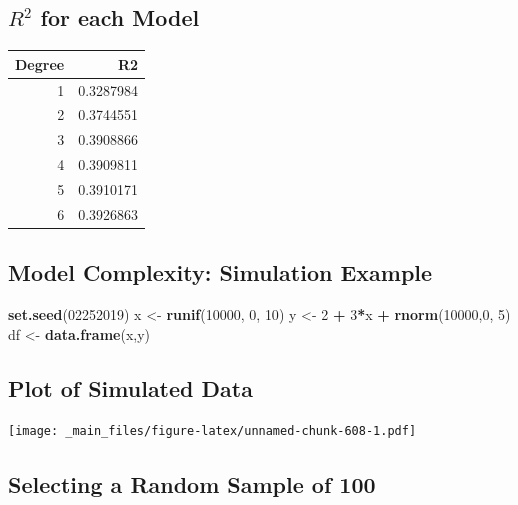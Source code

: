 \documentclass[]{book}
\newenvironment{Shaded}{\begin{snugshade}}{\end{snugshade}}
\newcommand{\KeywordTok}[1]{\textcolor[rgb]{0.13,0.29,0.53}{\textbf{#1}}}
\newcommand{\DecValTok}[1]{\textcolor[rgb]{0.00,0.00,0.81}{#1}}
\newcommand{\StringTok}[1]{\textcolor[rgb]{0.31,0.60,0.02}{#1}}
\newcommand{\OperatorTok}[1]{\textcolor[rgb]{0.81,0.36,0.00}{\textbf{#1}}}
\newcommand{\NormalTok}[1]{#1}
\begin{document}
\subsection{\texorpdfstring{\(R^2\) for each
Model}{R\^{}2 for each Model}}\label{r2-for-each-model}

\begin{tabular}{r|r}
\hline
Degree & R2\\
\hline
1 & 0.3287984\\
\hline
2 & 0.3744551\\
\hline
3 & 0.3908866\\
\hline
4 & 0.3909811\\
\hline
5 & 0.3910171\\
\hline
6 & 0.3926863\\
\hline
\end{tabular}

\subsection{Model Complexity: Simulation
Example}\label{model-complexity-simulation-example}

\begin{Shaded}
\begin{Highlighting}[]
\KeywordTok{set.seed}\NormalTok{(}\DecValTok{02252019}\NormalTok{)}
\NormalTok{x <-}\StringTok{ }\KeywordTok{runif}\NormalTok{(}\DecValTok{10000}\NormalTok{, }\DecValTok{0}\NormalTok{, }\DecValTok{10}\NormalTok{)}
\NormalTok{y <-}\StringTok{ }\DecValTok{2} \OperatorTok{+}\StringTok{ }\DecValTok{3}\OperatorTok{*}\NormalTok{x }\OperatorTok{+}\StringTok{ }\KeywordTok{rnorm}\NormalTok{(}\DecValTok{10000}\NormalTok{,}\DecValTok{0}\NormalTok{, }\DecValTok{5}\NormalTok{)}
\NormalTok{df <-}\StringTok{ }\KeywordTok{data.frame}\NormalTok{(x,y)}
\end{Highlighting}
\end{Shaded}

\subsection{Plot of Simulated Data}\label{plot-of-simulated-data}

\texttt{[image: \_main\_files/figure-latex/unnamed-chunk-608-1.pdf]}

\subsection{Selecting a Random Sample of
100}\label{selecting-a-random-sample-of-100}
\end{document}
